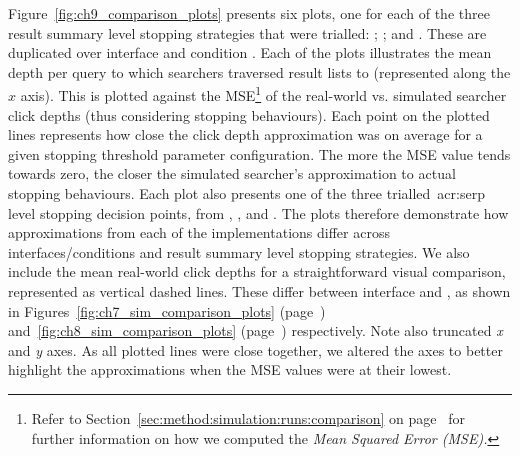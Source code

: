 Figure~\ref{fig:ch9_comparison_plots} presents six plots, one for each of the three result summary level stopping strategies that were trialled: ; ; and . These are duplicated over interface  and condition . Each of the plots illustrates the mean depth per query to which searchers traversed result lists to (represented along the $x$ axis). This is plotted against the MSE\footnote{Refer to Section~\ref{sec:method:simulation:runs:comparison} on page~\pageref{sec:method:simulation:runs:comparison} for further information on how we computed the \emph{Mean Squared Error (MSE).}} of the real-world vs. simulated searcher click depths (thus considering stopping behaviours). Each point on the plotted lines represents how close the click depth approximation was on average for a given stopping threshold parameter configuration. The more the MSE value tends towards zero, the closer the simulated searcher's approximation to actual stopping behaviours. Each plot also presents one of the three trialled~\gls{acr:serp} level stopping decision points, from , , and . The plots therefore demonstrate how approximations from each of the implementations differ across interfaces/conditions and result summary level stopping strategies. We also include the mean real-world click depths for a straightforward visual comparison, represented as vertical dashed lines. These differ between interface  and , as shown in Figures~\ref{fig:ch7_sim_comparison_plots} (page~\pageref{fig:ch7_sim_comparison_plots}) and~\ref{fig:ch8_sim_comparison_plots} (page~\pageref{fig:ch8_sim_comparison_plots}) respectively. Note also truncated \emph{x} and \emph{y} axes. As all plotted lines were close together, we altered the axes to better highlight the approximations when the MSE values were at their lowest.

